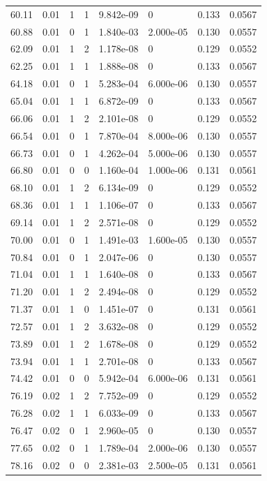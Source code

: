 \documentclass[preview]{standalone}
\begin{document}
{{{\begin{tabular}{L{1.2cm}C{1.2cm} C{0.3cm}C{0.5cm} C{1.4cm}C{1.4cm} C{1.4cm}C{1.4cm}}
  60.11  &  0.01  & 1     &  1 &  9.842e-09  & 0  & 0.133 &  0.0567   \\ 
  60.88  &  0.01  & 0     &  1 &  1.840e-03  & 2.000e-05  & 0.130 &  0.0557   \\ 
  62.09  &  0.01  & 1     &  2 &  1.178e-08  & 0  & 0.129 &  0.0552   \\ 
  62.25  &  0.01  & 1     &  1 &  1.888e-08  & 0  & 0.133 &  0.0567   \\ 
  64.18  &  0.01  & 0     &  1 &  5.283e-04  & 6.000e-06  & 0.130 &  0.0557   \\ 
  65.04  &  0.01  & 1     &  1 &  6.872e-09  & 0  & 0.133 &  0.0567   \\ 
  66.06  &  0.01  & 1     &  2 &  2.101e-08  & 0  & 0.129 &  0.0552   \\ 
  66.54  &  0.01  & 0     &  1 &  7.870e-04  & 8.000e-06  & 0.130 &  0.0557   \\ 
  66.73  &  0.01  & 0     &  1 &  4.262e-04  & 5.000e-06  & 0.130 &  0.0557   \\ 
  66.80  &  0.01  & 0     &  0 &  1.160e-04  & 1.000e-06  & 0.131 &  0.0561   \\ 
  68.10  &  0.01  & 1     &  2 &  6.134e-09  & 0  & 0.129 &  0.0552   \\ 
  68.36  &  0.01  & 1     &  1 &  1.106e-07  & 0  & 0.133 &  0.0567   \\ 
  69.14  &  0.01  & 1     &  2 &  2.571e-08  & 0  & 0.129 &  0.0552   \\ 
  70.00  &  0.01  & 0     &  1 &  1.491e-03  & 1.600e-05  & 0.130 &  0.0557   \\ 
  70.84  &  0.01  & 0     &  1 &  2.047e-06  & 0  & 0.130 &  0.0557   \\ 
  71.04  &  0.01  & 1     &  1 &  1.640e-08  & 0  & 0.133 &  0.0567   \\ 
  71.20  &  0.01  & 1     &  2 &  2.494e-08  & 0  & 0.129 &  0.0552   \\ 
  71.37  &  0.01  & 1     &  0 &  1.451e-07  & 0  & 0.131 &  0.0561   \\ 
  72.57  &  0.01  & 1     &  2 &  3.632e-08  & 0  & 0.129 &  0.0552   \\ 
  73.89  &  0.01  & 1     &  2 &  1.678e-08  & 0  & 0.129 &  0.0552   \\ 
  73.94  &  0.01  & 1     &  1 &  2.701e-08  & 0  & 0.133 &  0.0567   \\ 
  74.42  &  0.01  & 0     &  0 &  5.942e-04  & 6.000e-06  & 0.131 &  0.0561   \\ 
  76.19  &  0.02  & 1     &  2 &  7.752e-09  & 0  & 0.129 &  0.0552   \\ 
  76.28  &  0.02  & 1     &  1 &  6.033e-09  & 0  & 0.133 &  0.0567   \\ 
  76.47  &  0.02  & 0     &  1 &  2.960e-05  & 0  & 0.130 &  0.0557   \\ 
  77.65  &  0.02  & 0     &  1 &  1.789e-04  & 2.000e-06  & 0.130 &  0.0557   \\ 
  78.16  &  0.02  & 0     &  0 &  2.381e-03  & 2.500e-05  & 0.131 &  0.0561   \\ 
\hline 
\end{tabular} 

}}}
\end{document}
